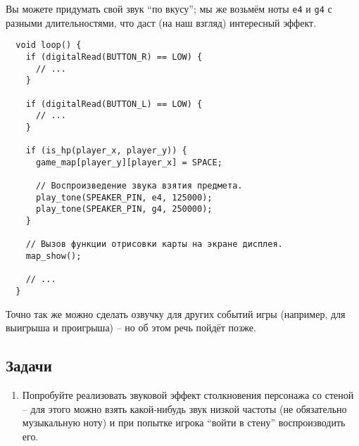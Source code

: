 \documentclass[../sparc.tex]{subfiles}
\begin{document}
Вы можете придумать свой звук ``по вкусу''; мы же возьмём ноты \texttt{e4} и
\texttt{g4} с разными длительностями, что даст (на наш взгляд) интересный
эффект.

\begin{verbatim}
  void loop() {
    if (digitalRead(BUTTON_R) == LOW) {
      // ...
    }

    if (digitalRead(BUTTON_L) == LOW) {
      // ...
    }

    if (is_hp(player_x, player_y)) {
      game_map[player_y][player_x] = SPACE;

      // Воспроизведение звука взятия предмета.
      play_tone(SPEAKER_PIN, e4, 125000);
      play_tone(SPEAKER_PIN, g4, 250000);
    }

    // Вызов функции отрисовки карты на экране дисплея.
    map_show();

    // ...
  }
\end{verbatim}

Точно так же можно сделать озвучку для других событий игры (например, для
выигрыша и проигрыша) -- но об этом речь пойдёт позже.

\subsection{Задачи}
\begin{enumerate}
\item Попробуйте реализовать звуковой эффект столкновения персонажа со стеной --
  для этого можно взять какой-нибудь звук низкой частоты (не обязательно
  музыкальную ноту) и при попытке игрока ``войти в стену'' воспроизводить его.
\end{enumerate}
\end{document}
